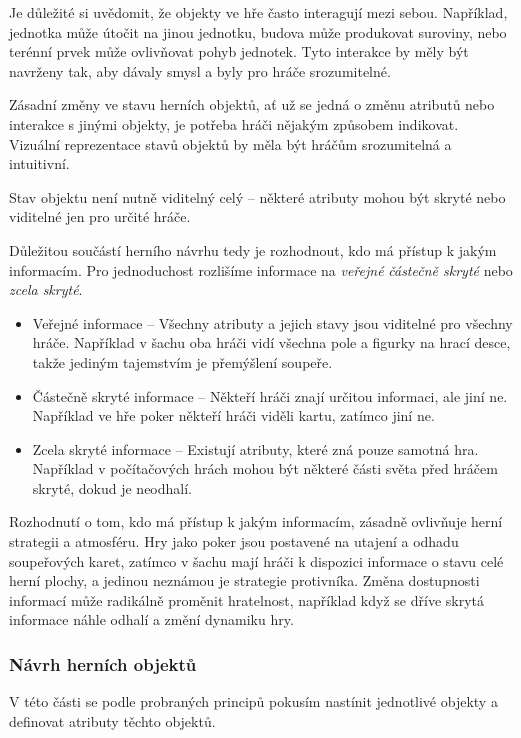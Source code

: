 Je důležité si uvědomit, že objekty ve hře často interagují mezi sebou. Například, jednotka může útočit na jinou jednotku, budova může produkovat suroviny, nebo terénní prvek může ovlivňovat pohyb jednotek. Tyto interakce by měly být navrženy tak, aby dávaly smysl a byly pro hráče srozumitelné.

Zásadní změny ve stavu herních objektů, ať už se jedná o změnu atributů nebo interakce s jinými objekty, je potřeba hráči nějakým způsobem indikovat. Vizuální reprezentace stavů objektů by měla být hráčům srozumitelná a intuitivní.

Stav objektu není nutně viditelný celý – některé atributy mohou být skryté nebo viditelné jen pro určité hráče.

Důležitou součástí herního návrhu tedy je rozhodnout, kdo má přístup k jakým informacím. Pro jednoduchost rozlišíme informace na \textit{veřejné} \textit{částečně skryté} nebo \textit{zcela skryté}. 

\begin{itemize}
    \item Veřejné informace -- Všechny atributy a jejich stavy jsou viditelné pro všechny hráče. Například v šachu oba hráči vidí všechna pole a figurky na hrací desce, takže jediným tajemstvím je přemýšlení soupeře.
    \item Částečně skryté informace -- Někteří hráči znají určitou informaci, ale jiní ne. Například ve hře poker někteří hráči viděli kartu, zatímco jiní ne.
    \item Zcela skryté informace -- Existují atributy, které zná pouze samotná hra. Například v počítačových hrách mohou být některé části světa před hráčem skryté, dokud je neodhalí.
\end{itemize}

Rozhodnutí o tom, kdo má přístup k jakým informacím, zásadně ovlivňuje herní strategii a atmosféru. Hry jako poker jsou postavené na utajení a odhadu soupeřových karet, zatímco v šachu mají hráči k dispozici informace o stavu celé herní plochy, a jedinou neznámou je strategie protivníka. Změna dostupnosti informací může radikálně proměnit hratelnost, například když se dříve skrytá informace náhle odhalí a změní dynamiku hry.

\subsubsection{Návrh herních objektů}

V této části se podle probraných principů pokusím nastínit jednotlivé objekty a definovat atributy těchto objektů.

